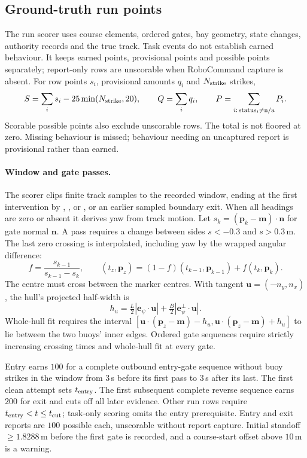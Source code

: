 \subsection{Ground-truth run points}

The run scorer uses course elements, ordered gates, bay geometry, state changes,
authority records and the true track. Task events do not establish earned
behaviour. It keeps earned points, provisional points and possible points
separately; report-only rows are unscorable when RoboCommand capture is absent.
For row points $s_i$, provisional amounts $q_i$ and $N_{\rm strike}$ strikes,
\[
 S=\sum_i s_i-25\min(N_{\rm strike},20),\qquad Q=\sum_i q_i,\qquad
 P=\sum_{i:\,\text{status}_i\ne\text{n/a}}P_i.
\]
Scorable possible points also exclude unscorable rows. The total is not floored
at zero. Missing behaviour is missed; behaviour needing an uncaptured report
is provisional rather than earned.

\paragraph{Window and gate passes.} The scorer clips finite track samples to
the recorded window, ending at the first intervention by ,
,  or , or an earlier sampled boundary
exit. When all headings are zero or absent it derives yaw from track motion.
Let $s_k=(\bm p_k-\bm m)\cdot\bm n$ for gate normal $\bm n$.
A pass requires a change between sides $s<-0.3$ and $s>0.3$\,m. The last
zero crossing is interpolated, including yaw by the wrapped angular difference:
\[
 f=\frac{s_{k-1}}{s_{k-1}-s_k},\qquad
 (t_z,\bm p_z)=(1-f)(t_{k-1},\bm p_{k-1})+f(t_k,\bm p_k).
\]
The centre must cross between the marker centres. With tangent
$\bm u=(-n_y,n_x)$, the hull's projected half-width is
\[
 h_u=\tfrac L2|\bm e_\psi\cdot\bm u|
       +\tfrac B2|\bm e_\psi^\perp\cdot\bm u|.
\]
Whole-hull fit requires the interval
$[\bm u\cdot(\bm p_z-\bm m)-h_u,\bm u\cdot(\bm p_z-\bm m)+h_u]$
to lie between the two buoys' inner edges. Ordered gate sequences require
strictly increasing crossing times and whole-hull fit at every gate.

Entry earns $100$ for a complete outbound entry-gate sequence without buoy
strikes in the window from $3$\,s before its first pass to $3$\,s after its last.
The first clean attempt sets $t_{\rm entry}$. The first subsequent complete
reverse sequence earns $200$ for exit and cuts off all later evidence.
Other run rows require $t_{\rm entry}<t\le t_{\rm cut}$; task-only scoring
omits the entry prerequisite. Entry and exit reports are $100$ possible each,
unscorable without report capture. Initial standoff $\ge1.8288$\,m before the
first gate is recorded, and a course-start offset above $10$\,m is a warning.

